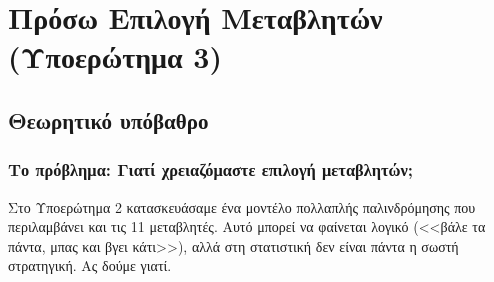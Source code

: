 \documentclass[12pt,a4paper]{article}
\begin{document}
\newpage
\section{Πρόσω Επιλογή Μεταβλητών (Υποερώτημα 3)}

\subsection{Θεωρητικό υπόβαθρο}

\subsubsection{Το πρόβλημα: Γιατί χρειαζόμαστε επιλογή μεταβλητών;}

Στο Υποερώτημα 2 κατασκευάσαμε ένα μοντέλο πολλαπλής παλινδρόμησης που περιλαμβάνει και τις 11 μεταβλητές. Αυτό μπορεί να φαίνεται λογικό (<<βάλε τα πάντα, μπας και βγει κάτι>>), αλλά στη στατιστική δεν είναι πάντα η σωστή στρατηγική. Ας δούμε γιατί.
\end{document}
